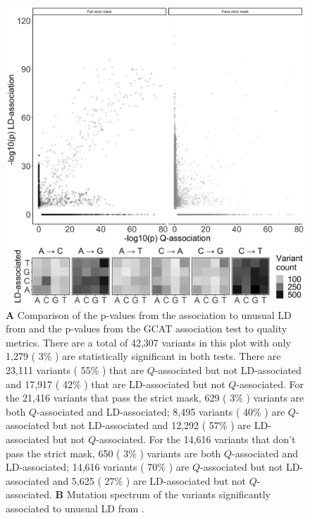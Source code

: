\documentclass[9pt,article]{template}
\begin{document}
\begin{figure}[tbp]
\centering
\includegraphics[width=13cm,keepaspectratio]{../Figures/Mafessoni_MutSpect.jpg}
\caption{ \textbf{A} Comparison of the p-values from the association to unusual LD from \cite{mafessoni2018turning} and the p-values from the GCAT association test to quality metrics.
There are a total of 42,307 variants in this plot with only 1,279 ( 3\% ) are statistically significant in both tests.
There are 23,111  variants ( 55\% ) that are $Q$-associated but not LD-associated and 17,917 ( 42\% ) that are LD-associated but not $Q$-associated.
For the 21,416 variants that pass the strict mask, 629 ( 3\% ) variants are both $Q$-associated and LD-associated; 8,495 variants ( 40\% ) are $Q$-associated but not LD-associated and 12,292 ( 57\% ) are LD-associated but not $Q$-associated.
For the 14,616 variants that don't pass the strict mask, 650 ( 3\% ) variants are both $Q$-associated and LD-associated; 14,616 variants ( 70\% ) are $Q$-associated but not LD-associated and 5,625 ( 27\% ) are LD-associated but not $Q$-associated.
\textbf{B} Mutation spectrum of the variants significantly associated to unusual LD from \cite{mafessoni2018turning}. }  
\label{Mafessoni_MutSpect}
\end{figure}
\end{document}
